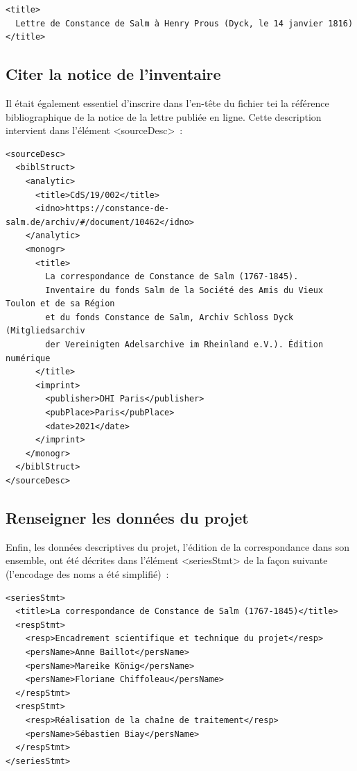 \documentclass[a4paper,12pt,twoside]{book}
\begin{document}
				\small
				\begin{verbatim}
<title>
  Lettre de Constance de Salm à Henry Prous (Dyck, le 14 janvier 1816)
</title>
				\end{verbatim}
				\normalsize
				
				
			\subsection{Citer la notice de l'inventaire}
			
				Il était également essentiel d'inscrire dans l'en-tête du fichier \gls{tei} la référence bibliographique de la notice de la lettre publiée en ligne. Cette description intervient dans l'élément \textsf{<sourceDesc>}~:
				
				\small
				\begin{verbatim}
<sourceDesc>
  <biblStruct>
    <analytic>
      <title>CdS/19/002</title>
      <idno>https://constance-de-salm.de/archiv/#/document/10462</idno>
    </analytic>
    <monogr>
      <title>
        La correspondance de Constance de Salm (1767-1845). 
        Inventaire du fonds Salm de la Société des Amis du Vieux Toulon et de sa Région 
        et du fonds Constance de Salm, Archiv Schloss Dyck (Mitgliedsarchiv 
        der Vereinigten Adelsarchive im Rheinland e.V.). Édition numérique
      </title>
      <imprint>
        <publisher>DHI Paris</publisher>
        <pubPlace>Paris</pubPlace>
        <date>2021</date>
      </imprint>
    </monogr>
  </biblStruct>
</sourceDesc>
				\end{verbatim}
				\normalsize
				
			\subsection{Renseigner les données du projet}
			
				Enfin, les données descriptives du projet, l'édition de la correspondance dans son ensemble, ont été décrites dans l'élément \textsf{<seriesStmt>} de la façon suivante (l'encodage des noms a été simplifié)~:
				
				\small
				\begin{verbatim}
<seriesStmt>
  <title>La correspondance de Constance de Salm (1767-1845)</title>
  <respStmt>
    <resp>Encadrement scientifique et technique du projet</resp>
    <persName>Anne Baillot</persName>
    <persName>Mareike König</persName>
    <persName>Floriane Chiffoleau</persName>
  </respStmt>
  <respStmt>
    <resp>Réalisation de la chaîne de traitement</resp>
    <persName>Sébastien Biay</persName>
  </respStmt>
</seriesStmt>
				\end{verbatim}
				\normalsize
\end{document}
